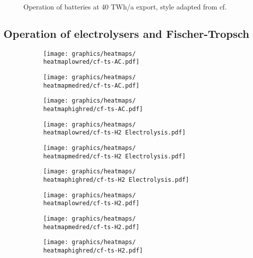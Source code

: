 \begin{figure}[h]
    \caption{Operation of batteries at 40 TWh/a export, style adapted from cf. \cite{Neumann2022}}
    \label{fig:battery_operation}
\end{figure}



\subsection{Operation of electrolysers and Fischer-Tropsch}


\begin{figure}[h]
    \centering
        \begin{subfigure}[h]{0.33\textwidth}
            \centering
        \texttt{[image: graphics/heatmaps/\\heatmaplowred/cf-ts-AC.pdf]}
    \end{subfigure}
    \begin{subfigure}[h]{0.33\textwidth}
        \centering
        \texttt{[image: graphics/heatmaps/\\heatmapmedred/cf-ts-AC.pdf]}
    \end{subfigure}
    \begin{subfigure}[h]{0.33\textwidth}
        \centering
        \texttt{[image: graphics/heatmaps/\\heatmaphighred/cf-ts-AC.pdf]}
    \end{subfigure}


    \begin{subfigure}[h]{0.33\textwidth}
        \centering
        \texttt{[image: graphics/heatmaps/\\heatmaplowred/cf-ts-H2 Electrolysis.pdf]}
    \end{subfigure}
    \begin{subfigure}[h]{0.33\textwidth}
        \centering
        \texttt{[image: graphics/heatmaps/\\heatmapmedred/cf-ts-H2 Electrolysis.pdf]}
    \end{subfigure}
    \begin{subfigure}[h]{0.33\textwidth}
        \centering
        \texttt{[image: graphics/heatmaps/\\heatmaphighred/cf-ts-H2 Electrolysis.pdf]}
    \end{subfigure}

    \begin{subfigure}[h]{0.33\textwidth}
        \centering
        \texttt{[image: graphics/heatmaps/\\heatmaplowred/cf-ts-H2.pdf]}
    \end{subfigure}
    \begin{subfigure}[h]{0.33\textwidth}
        \centering
        \texttt{[image: graphics/heatmaps/\\heatmapmedred/cf-ts-H2.pdf]}
    \end{subfigure}
    \begin{subfigure}[h]{0.33\textwidth}
        \centering
        \texttt{[image: graphics/heatmaps/\\heatmaphighred/cf-ts-H2.pdf]}
        

\end{subfigure}
\end{figure}
